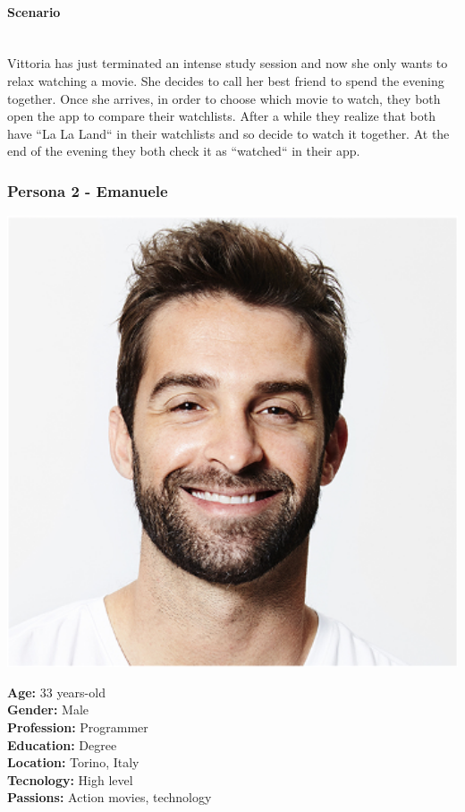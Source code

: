 \documentclass[12pt, a4paper]{article}
\begin{document}
\paragraph{Scenario}\mbox{}\\
Vittoria has just terminated an intense study session and now she only wants to
relax watching a movie. She decides to call her best friend to spend the evening together.
Once she arrives, in order to choose which movie to watch, they both open the app to
compare their watchlists. After a while they realize that both have “La La Land“ in their
watchlists and so decide to watch it together.
At the end of the evening they both check it as “watched“ in their app.

\subsubsection{Persona 2 - Emanuele}

\begin{minipage}{0.25\textwidth}
	\includegraphics[width=1\textwidth]{images/emanuele.png}
\end{minipage}
\hspace{0.02\linewidth}
\begin{minipage}{0.6\textwidth}
	\textbf{Age:} 33 years-old\\
	\textbf{Gender:} Male\\
	\textbf{Profession:} Programmer\\
	\textbf{Education:} Degree\\
	\textbf{Location:} Torino, Italy\\
	\textbf{Tecnology:} High level\\
	\textbf{Passions:} Action movies, technology\\
\end{minipage}
\end{document}
